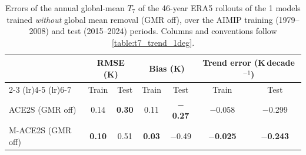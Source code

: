 \begin{table}[H]
  \caption{Errors of the annual global-mean $T_7$ of the 46-year ERA5 rollouts of the 1\textdegree{} models trained \emph{without} global mean removal (GMR off), over the AIMIP training (1979--2008) and test (2015--2024) periods. Columns and conventions follow \autoref{table:t7_trend_1deg}.}
  \label{table:t7_trend_1deg_gmroff}
  \centering
  \small
  \begin{tabular}{lcccccc}
    \toprule
     & \multicolumn{2}{c}{RMSE (K)} & \multicolumn{2}{c}{Bias (K)} & \multicolumn{2}{c}{Trend error (K\,decade$^{-1}$)} \\
    \cmidrule(lr){2-3} \cmidrule(lr){4-5} \cmidrule(lr){6-7}
     & Train & Test & Train & Test & Train & Test \\
    \midrule
    ACE2S (GMR off) & 0.14 & \textbf{0.30} & 0.11 & \textbf{$-$0.27} & $-$0.058 & $-$0.299 \\
    M-ACE2S (GMR off) & \textbf{0.10} & 0.51 & \textbf{0.03} & $-$0.49 & \textbf{$-$0.025} & \textbf{$-$0.243} \\
    \bottomrule
  \end{tabular}
\end{table}
